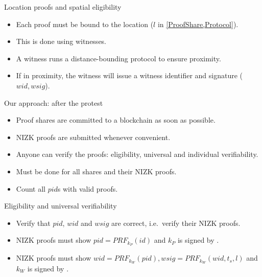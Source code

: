 \begin{columns}[t]
\begin{column}{0.32\linewidth}
    \begin{whiteblock}{Location proofs and spatial eligibility}
      \begin{itemize}
        \item Each proof must be bound to the location (\(l\) in 
          \cref{ProofShare,Protocol}).
        \item This is done using witnesses.
        \item A witness runs a distance-bounding protocol to ensure proximity.
        \item If in proximity, the witness will issue a witness identifier and 
          signature (\(wid, wsig\)).
      \end{itemize}
    \end{whiteblock}

    \begin{greenblock}{Our approach: after the protest}
      \begin{itemize}
        \item Proof shares are committed to a blockchain as soon as possible.
        \item \ac{NIZK} proofs are submitted whenever convenient.
        \item Anyone can verify the proofs: eligibility, universal and 
          individual verifiability.
        \item Must be done for all shares and their \ac{NIZK} proofs.
        \item Count all \(pid\)s with valid proofs.
      \end{itemize}
    \end{greenblock}

    \begin{whiteblock}{Eligibility and universal verifiability}
      \begin{itemize}
        \item Verify that \(pid\), \(wid\) and \(wsig\) are correct, i.e.\ verify 
          their \ac{NIZK} proofs.
        \item \ac{NIZK} proofs must show \(pid = PRF_{k_P}(id)\) and \(k_P\) is 
          signed by .
        \item \ac{NIZK} proofs must show \(wid = PRF_{k_W}(pid), wsig = 
            PRF_{k_W}(wid, t_s, l)\) and \(k_W\) is signed by .
      \end{itemize}
    \end{whiteblock}


\end{column}
\end{columns}
